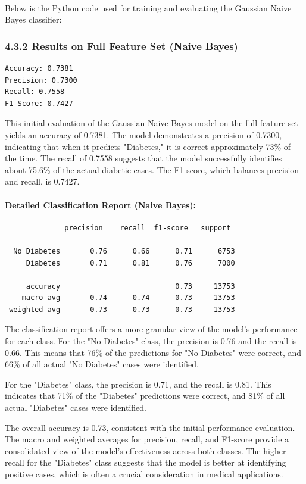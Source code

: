 \\
Below is the Python code used for training and evaluating the Gaussian Naive Bayes classifier:


\subsubsection*{4.3.2 Results on Full Feature Set (Naive Bayes)}

\begin{verbatim}
Accuracy: 0.7381
Precision: 0.7300
Recall: 0.7558
F1 Score: 0.7427
\end{verbatim}
This initial evaluation of the Gaussian Naive Bayes model on the full feature set yields an accuracy of 0.7381. The model demonstrates a precision of 0.7300, indicating that when it predicts "Diabetes," it is correct approximately 73\% of the time. The recall of 0.7558 suggests that the model successfully identifies about 75.6\% of the actual diabetic cases. The F1-score, which balances precision and recall, is 0.7427.

\paragraph*{Detailed Classification Report (Naive Bayes):}
\begin{verbatim}
              precision    recall  f1-score   support

  No Diabetes       0.76      0.66      0.71      6753
     Diabetes       0.71      0.81      0.76      7000

     accuracy                           0.73     13753
    macro avg       0.74      0.74      0.73     13753
 weighted avg       0.73      0.73      0.73     13753
\end{verbatim}
The classification report offers a more granular view of the model's performance for each class. For the "No Diabetes" class, the precision is 0.76 and the recall is 0.66. This means that 76\% of the predictions for "No Diabetes" were correct, and 66\% of all actual "No Diabetes" cases were identified.

For the "Diabetes" class, the precision is 0.71, and the recall is 0.81. This indicates that 71\% of the "Diabetes" predictions were correct, and 81\% of all actual "Diabetes" cases were identified.

The overall accuracy is 0.73, consistent with the initial performance evaluation. The macro and weighted averages for precision, recall, and F1-score provide a consolidated view of the model's effectiveness across both classes. The higher recall for the "Diabetes" class suggests that the model is better at identifying positive cases, which is often a crucial consideration in medical applications.